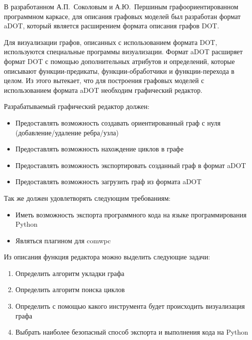 \def\notedate{2022.12.23}
\def\currentauthor{Журавлев Н.В. (РК6-72Б)}

В разработанном А.П.~Соколовым и А.Ю.~Першиным графоориентированном программном каркасе, для описания графовых моделей был разработан формат aDOT, который является расширением формата описания графов DOT.

Для визуализации графов, описанных с использованием формата DOT, используются специальные программы визуализации. Формат aDOT расширяет формат DOT с помощью дополнительных атрибутов и определений, которые описывают функции-предикаты, функции-обработчики и функции-перехода в целом.
Из этого вытекает, что для построения графовых моделей с использованием формата aDOT необходим графический редактор.

Разрабатываемый графический редактор должен:
\begin{itemize}
\item  Предоставлять возможность создавать ориентированный граф с нуля (добавление/удаление ребра/узла)
\item Предоставлять возможность нахождение циклов в графе
\item Предоставлять возможность экспортировать созданный граф в формат aDOT
\item Предоставлять возможность загрузить граф из формата aDOT
\end{itemize}

Так же должен удовлетворять следующим требованиям:
\begin{itemize}
\item Иметь возможность экспорта программного кода на языке программирования Python
\item Являться плагином для comwpc
\end{itemize}

Из описания функция редактора можно выделить следующие задачи: 
\begin{enumerate}
\item Определить алгоритм укладки графа
\item Определить алгоритм поиска циклов
\item Определить с помощью какого инструмента будет происходить визуализация графа
\item Выбрать наиболее безопасный способ экспорта и выполнения кода на Python
\end{enumerate}

